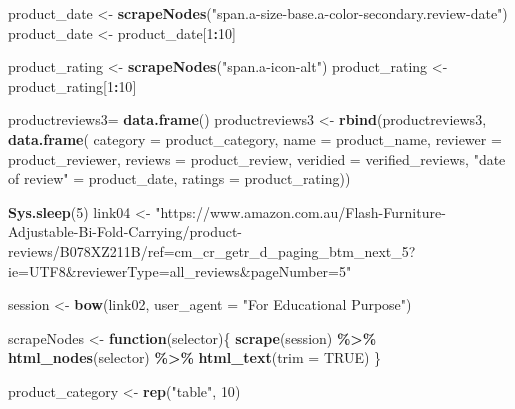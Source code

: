 \documentclass[
]{article}
\newenvironment{Shaded}{\begin{snugshade}}{\end{snugshade}}
\newcommand{\AttributeTok}[1]{\textcolor[rgb]{0.13,0.29,0.53}{#1}}
\newcommand{\ConstantTok}[1]{\textcolor[rgb]{0.56,0.35,0.01}{#1}}
\newcommand{\ControlFlowTok}[1]{\textcolor[rgb]{0.13,0.29,0.53}{\textbf{#1}}}
\newcommand{\DecValTok}[1]{\textcolor[rgb]{0.00,0.00,0.81}{#1}}
\newcommand{\FunctionTok}[1]{\textcolor[rgb]{0.13,0.29,0.53}{\textbf{#1}}}
\newcommand{\NormalTok}[1]{#1}
\newcommand{\OtherTok}[1]{\textcolor[rgb]{0.56,0.35,0.01}{#1}}
\newcommand{\SpecialCharTok}[1]{\textcolor[rgb]{0.81,0.36,0.00}{\textbf{#1}}}
\newcommand{\StringTok}[1]{\textcolor[rgb]{0.31,0.60,0.02}{#1}}
\begin{document}
\begin{Shaded}
\begin{Highlighting}[]
\NormalTok{  product\_date }\OtherTok{\textless{}{-}} \FunctionTok{scrapeNodes}\NormalTok{(}\StringTok{"span.a{-}size{-}base.a{-}color{-}secondary.review{-}date"}\NormalTok{)}
\NormalTok{  product\_date }\OtherTok{\textless{}{-}}\NormalTok{ product\_date[}\DecValTok{1}\SpecialCharTok{:}\DecValTok{10}\NormalTok{]}
  
\NormalTok{  product\_rating }\OtherTok{\textless{}{-}} \FunctionTok{scrapeNodes}\NormalTok{(}\StringTok{"span.a{-}icon{-}alt"}\NormalTok{)}
\NormalTok{  product\_rating }\OtherTok{\textless{}{-}}\NormalTok{ product\_rating[}\DecValTok{1}\SpecialCharTok{:}\DecValTok{10}\NormalTok{]}
  
\NormalTok{  productreviews3}\OtherTok{=} \FunctionTok{data.frame}\NormalTok{()}
\NormalTok{  productreviews3 }\OtherTok{\textless{}{-}} \FunctionTok{rbind}\NormalTok{(productreviews3, }\FunctionTok{data.frame}\NormalTok{(}
                      \AttributeTok{category =}\NormalTok{ product\_category,}
                      \AttributeTok{name =}\NormalTok{ product\_name,}
                      \AttributeTok{reviewer =}\NormalTok{ product\_reviewer,}
                      \AttributeTok{reviews =}\NormalTok{ product\_review,}
                      \AttributeTok{veridied =}\NormalTok{ verified\_reviews,}
                      \StringTok{"date of review"} \OtherTok{=}\NormalTok{ product\_date,}
                      \AttributeTok{ratings =}\NormalTok{ product\_rating))}
  
   \FunctionTok{Sys.sleep}\NormalTok{(}\DecValTok{5}\NormalTok{)}
\NormalTok{link04 }\OtherTok{\textless{}{-}} \StringTok{"https://www.amazon.com.au/Flash{-}Furniture{-}Adjustable{-}Bi{-}Fold{-}Carrying/product{-}reviews/B078XZ211B/ref=cm\_cr\_getr\_d\_paging\_btm\_next\_5?ie=UTF8\&reviewerType=all\_reviews\&pageNumber=5"}


\NormalTok{  session }\OtherTok{\textless{}{-}} \FunctionTok{bow}\NormalTok{(link02,}
               \AttributeTok{user\_agent =} \StringTok{"For Educational Purpose"}\NormalTok{)}

\NormalTok{  scrapeNodes }\OtherTok{\textless{}{-}} \ControlFlowTok{function}\NormalTok{(selector)\{}
    \FunctionTok{scrape}\NormalTok{(session) }\SpecialCharTok{\%\textgreater{}\%}
      \FunctionTok{html\_nodes}\NormalTok{(selector) }\SpecialCharTok{\%\textgreater{}\%}
      \FunctionTok{html\_text}\NormalTok{(}\AttributeTok{trim =} \ConstantTok{TRUE}\NormalTok{)}
\NormalTok{  \}}

\NormalTok{  product\_category }\OtherTok{\textless{}{-}} \FunctionTok{rep}\NormalTok{(}\StringTok{"table"}\NormalTok{, }\DecValTok{10}\NormalTok{)}


\end{Highlighting}
\end{Shaded}
\end{document}
